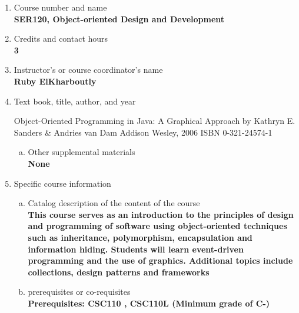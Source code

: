\label{SER120}  %
\begin{enumerate}[1.]
\item Course number and name\\
  {\bfseries
    SER120, Object-oriented Design and Development
  }

\item Credits and contact hours\\
  {\bfseries
    3
  }

\item Instructor's or course coordinator's name\\
  {\bfseries
    Ruby ElKharboutly
  }

\item Text book, title, author, and year\\
  {\bfseries


	Object-Oriented Programming in Java: A Graphical Approach by Kathryn E. Sanders \& Andries van Dam
	Addison Wesley, 2006
	ISBN 0-321-24574-1
  }
\begin{enumerate}[a.]
\item Other supplemental materials\\
  {\bfseries
    None
  }
\end{enumerate}

\item Specific course information
\begin{enumerate}[a.]
\item Catalog description of the content of the course\\
  {\bfseries
    This course serves as an introduction to the principles of design and programming of software using object-oriented techniques such as inheritance, polymorphism, encapsulation and information hiding. Students will learn event-driven programming and the use of graphics. Additional topics include collections, design patterns and frameworks   }

\item prerequisites or co-requisites\\
  {\bfseries
    Prerequisites: CSC110 , CSC110L (Minimum grade of C-)
  }


\end{enumerate}
\end{enumerate}
